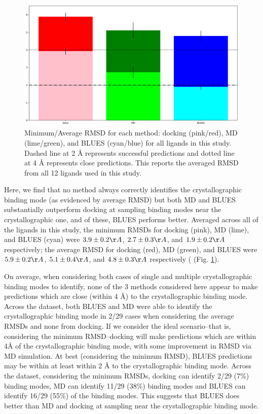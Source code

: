 \begin{figure}
    \centering
    \includegraphics{chapter6/Figures/averages.png}
    \caption[Average RMSD]{Minimum/Average RMSD for each method: docking (pink/red), MD (lime/green), and BLUES (cyan/blue) for all ligands in this study. Dashed line at 2 {\AA} represents successful predictions and dotted line at 4 {\AA} represents close predictions. This reports the averaged RMSD from all 12 ligands used in this study.}
    \label{fig:averages}
\end{figure}
Here, we find that no method always correctly identifies the crystallographic binding mode (as evidenced by average RMSD) but both MD and BLUES substantially outperform docking at sampling binding modes near the crystallographic one, and of these, BLUES performs better.
Averaged across all of the ligands in this study,  the minimum RMSDs for docking (pink), MD (lime), and BLUES (cyan) were $3.9 \pm 0.2 {\AA}$, $2.7 \pm 0.3 {\AA}$, and $1.9 \pm 0.2 {\AA}$ respectively; the average RMSD for docking (red), MD (green), and BLUES were $5.9 \pm 0.2 {\AA}$, $5.1 \pm 0.4 {\AA}$, and $4.8 \pm 0.3 {\AA}$ respectively ( (Fig. \ref{fig:averages}).

On average, when considering both cases of single and multiple crystallographic binding modes to identify, none of the 3 methods considered here appear to make predictions which are close (within 4 {\AA}) to the crystallographic binding mode.
Across the dataset, both BLUES and MD were able to identify the crystallographic binding mode in 2/29 cases when considering the average RMSDs and none from docking.
If we consider the ideal scenario--that is, considering the minimum RMSD--docking will make predictions which are within 4{\AA} of the crystallographic binding mode, with some improvement in RMSD via MD simulation.
At best (considering the minimum RMSD), BLUES predictions may be within at least within 2 {\AA} to the crystallographic binding mode.
Across the dataset, considering the minimum RMSDs, docking can identify 2/29 (7\%) binding modes, MD can identify 11/29 (38\%) binding modes and BLUES can identify 16/29 (55\%) of the binding modes.
This suggests that BLUES does better than MD and docking at sampling near the crystallographic binding mode.

